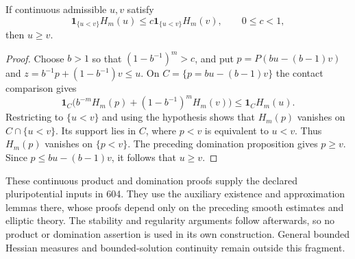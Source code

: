 \begin{proposition}\label{draft:605-strict-hessian-domination}
If continuous admissible $u,v$ satisfy
\[
 \mathbf1_{\{u<v\}}H_m(u)\leq
                    c\mathbf1_{\{u<v\}}H_m(v),\qquad 0\leq c<1,
\]
then $u\geq v$.
\end{proposition}
\begin{proof}
Choose $b>1$ so that $(1-b^{-1})^m>c$, and put
$p=P(bu-(b-1)v)$ and $z=b^{-1}p+(1-b^{-1})v\leq u$.
On $C=\{p=bu-(b-1)v\}$ the contact comparison gives
\[
 \mathbf1_C\bigl(b^{-m}H_m(p)+(1-b^{-1})^mH_m(v)\bigr)
                                  \leq\mathbf1_C H_m(u).
\]
Restricting to $\{u<v\}$ and using the hypothesis shows that
$H_m(p)$ vanishes on $C\cap\{u<v\}$. Its support lies in $C$, where
$p<v$ is equivalent to $u<v$. Thus $H_m(p)$ vanishes on $\{p<v\}$.
The preceding domination proposition gives $p\geq v$.
Since $p\leq bu-(b-1)v$, it follows that $u\geq v$.
\end{proof}

These continuous product and domination proofs supply the declared
pluripotential inputs in 604. They use the auxiliary existence and
approximation lemmas there, whose proofs depend only on the preceding
smooth estimates and elliptic theory. The stability and regularity
arguments follow afterwards, so no product or domination assertion is
used in its own construction. General bounded Hessian measures and
bounded-solution continuity remain outside this fragment.
